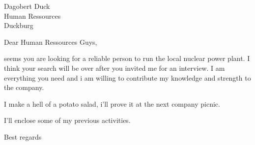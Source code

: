 \documentclass[tastyFriedLiver]{scrlttr2}
\begin{document}
\begin{letter}{Dagobert Duck\\
		Human Ressources\\
	Duckburg}
	\opening{Dear Human Ressources Guys,}

	seems you are looking for a reliable person to run the
	local nuclear power plant. I think your search will be
	over after you invited me for an interview. I am
	 everything you need and i am willing to contribute my
	knowledge and strength to the company. 

	I make a hell of a potato salad, i'll prove it at
	the next company picnic.

	I'll enclose some of my previous activities.

	\closing{Best regards}
\end{letter}
\end{document}
